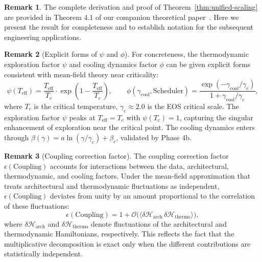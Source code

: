 \documentclass[11pt, a4paper]{article}
\theoremstyle{definition}
\newtheorem{remark}{Remark}[section]
\begin{document}
\begin{remark}
The complete derivation and proof of Theorem~\ref{thm:unified-scaling} are provided in Theorem 4.1 of our companion theoretical paper~\cite{liu2024unified}. Here we present the result for completeness and to establish notation for the subsequent engineering applications.
\end{remark}

\begin{remark}[Explicit forms of $\psi$ and $\phi$]
For concreteness, the thermodynamic exploration factor $\psi$ and cooling dynamics factor $\phi$ can be given explicit forms consistent with mean‑field theory near criticality:
\begin{equation}
\psi(T_{\text{eff}}) = \frac{T_{\text{eff}}}{T_c} \cdot \exp\!\left(1 - \frac{T_{\text{eff}}}{T_c}\right),
\qquad
\phi(\gamma_{\text{cool}}, \text{Scheduler}) = \frac{\exp(-\gamma_{\text{cool}}/\gamma_c)}{1 + \gamma_{\text{cool}}/\gamma_c},
\end{equation}
where $T_c$ is the critical temperature, $\gamma_c \approx 2.0$ is the EOS critical scale. The exploration factor $\psi$ peaks at $T_{\text{eff}} = T_c$ with $\psi(T_c) = 1$, capturing the singular enhancement of exploration near the critical point. The cooling dynamics enters through $\beta(\gamma) = a\ln(\gamma/\gamma_c)+\beta_c$, validated by Phase 4b.
\end{remark}

\begin{remark}[Coupling correction factor]
The coupling correction factor $\epsilon(\text{Coupling})$ accounts for interactions between the data, architectural, thermodynamic, and cooling factors. Under the mean‑field approximation that treats architectural and thermodynamic fluctuations as independent, $\epsilon(\text{Coupling})$ deviates from unity by an amount proportional to the correlation of these fluctuations:
\begin{equation}
\epsilon(\text{Coupling}) = 1 + \mathcal{O}\big(\langle \delta\mathcal{H}_{\text{arch}} \,\delta\mathcal{H}_{\text{thermo}} \rangle\big),
\end{equation}
where $\delta\mathcal{H}_{\text{arch}}$ and $\delta\mathcal{H}_{\text{thermo}}$ denote fluctuations of the architectural and thermodynamic Hamiltonians, respectively. This reflects the fact that the multiplicative decomposition is exact only when the different contributions are statistically independent.
\end{remark}
\end{document}
